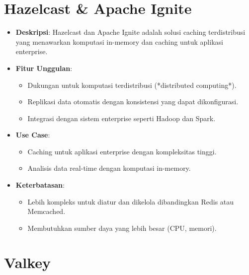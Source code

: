 \documentclass[11pt, a4paper]{book}
\begin{document}
	\section{Hazelcast \& Apache Ignite}
	\label{sec:hazelcast-ignite}
	
	\begin{itemize}
		\item \textbf{Deskripsi}:  
		Hazelcast dan Apache Ignite adalah solusi caching terdistribusi yang menawarkan komputasi in-memory dan caching untuk aplikasi enterprise.
		
		\item \textbf{Fitur Unggulan}:
		\begin{itemize}
			\item Dukungan untuk komputasi terdistribusi (*distributed computing*).
			\item Replikasi data otomatis dengan konsistensi yang dapat dikonfigurasi.
			\item Integrasi dengan sistem enterprise seperti Hadoop dan Spark.
		\end{itemize}
		
		\item \textbf{Use Case}:
		\begin{itemize}
			\item Caching untuk aplikasi enterprise dengan kompleksitas tinggi.
			\item Analisis data real-time dengan komputasi in-memory.
		\end{itemize}
		
		\item \textbf{Keterbatasan}:
		\begin{itemize}
			\item Lebih kompleks untuk diatur dan dikelola dibandingkan Redis atau Memcached.
			\item Membutuhkan sumber daya yang lebih besar (CPU, memori).
		\end{itemize}
	\end{itemize}
	
	\section{Valkey}
	\label{sec:valkey}
	
\end{document}
